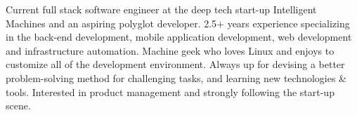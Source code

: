 

\begin{cvparagraph}

Current full stack software engineer at the deep tech start-up Intelligent Machines and an aspiring polyglot developer. 2.5+ years experience specializing in the back-end development, mobile application development, web development and infrastructure automation. Machine geek who loves Linux and enjoys to customize all of the development environment. Always up for devising a better problem-solving method for challenging tasks, and learning new technologies \& tools. Interested in product management and strongly following the start-up scene.
\end{cvparagraph}
